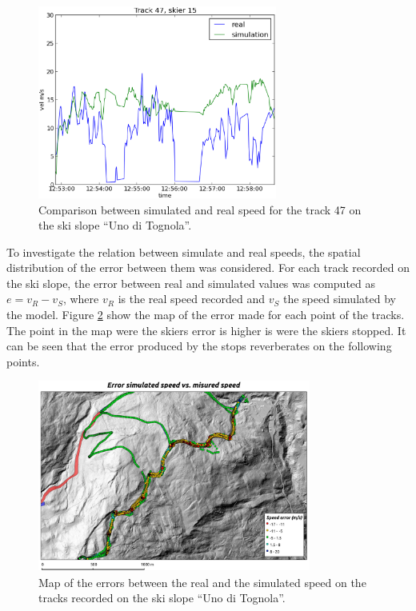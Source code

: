 \documentclass[12pt,a4paper,twoside]{book}
\begin{document}
\begin{figure}[!b]
  \begin{center}
    \includegraphics[width=0.7\textwidth]{images/sm_track47.eps}
    \caption{Comparison between simulated and real speed for the track 47 on the ski slope ``Uno di Tognola''.}\label{sm_track47}
  \end{center}
\end{figure}

To investigate the relation between simulate and real speeds, the spatial distribution of the error between them was considered. For each track recorded on the ski slope, the error between real and simulated values was computed as $e=v_R-v_S$, where $v_R$ is the real speed recorded and $v_S$ the speed simulated by the model. Figure \ref{map_error} show the map of the error made for each point of the tracks. The point in the map were the skiers error is higher is were the skiers stopped. It can be seen that the error produced by the stops reverberates on the following points.

\begin{figure}
  \centering
    \includegraphics[width=0.8\textwidth]{images/map_error.eps}
    \caption{Map of the errors between the real and the simulated speed on the tracks recorded on the ski slope ``Uno di Tognola''.}\label{map_error}
\end{figure}
\end{document}
